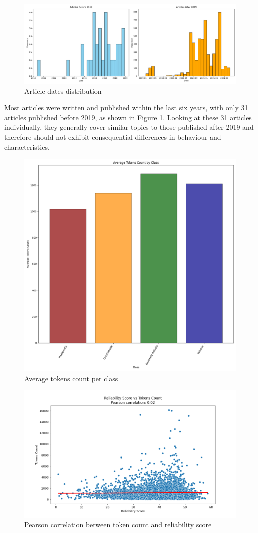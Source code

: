 \begin{figure}[htbp]
    \includegraphics[width=0.9\linewidth]{figures/dates_hist.png}
    \caption{Article dates distribution}
    \label{fig:dates_hist}
\end{figure}

Most articles were written and published within the last six years, with only 31 articles published before 2019, as shown in Figure \ref{fig:dates_hist}. Looking at these 31 articles individually, they generally cover similar topics to those published after 2019 and therefore should not exhibit consequential differences in behaviour and characteristics.

\begin{figure}[htbp]
    \centering
    \includegraphics[width=0.6\linewidth]{figures/tokens_count_vx_per_class_hist.png}
    \caption{Average tokens count per class}
    \label{fig:avg_tokens_count_per_class}
\end{figure}

\begin{figure}[htbp]
    \centering
    \includegraphics[width=0.9\linewidth]{figures/correlation_tokens_reliability_score.png}
    \caption{Pearson correlation between token count and reliability score}
    \label{fig:pearson_correlation}
\end{figure}



